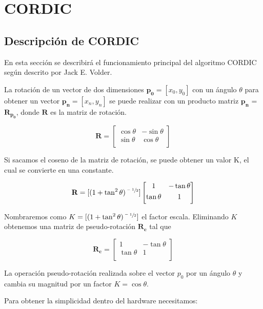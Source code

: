 \chapter{CORDIC}
\section{Descripción de CORDIC}

En esta sección se describirá el funcionamiento principal del algoritmo CORDIC según descrito por Jack E. Volder.

La rotación de un vector de dos dimensiones $\boldsymbol{p_{0}} = [x_{0},y_{0}]$ con un ángulo $\theta$ para obtener un vector $\boldsymbol{p_{n}} = [x_{n},y_{n}]$ se puede realizar con un producto matriz $\boldsymbol{p_{n}}$ = $\boldsymbol{R_{p_{0}}}$, donde $\textbf{R}$ es la matriz de rotación.

\[ \textbf{R} = \begin{bmatrix}
\cos{\theta} & -\sin{\theta} 	\\[0.3em]
\sin{\theta}  & \cos{\theta} 			\\[0.3em]
\end{bmatrix} \]

Si sacamos el coseno de la matriz de rotación, se puede obtener un valor K, el cual se convierte en una constante.

\[ \textbf{R} = [(1 + \tan^2{\theta})^{\sfrac{-1}{2}}] \begin{bmatrix}
1 & -\tan{\theta} 	\\[0.3em]
\tan{\theta}  & 1 			\\[0.3em]
\end{bmatrix} \]

Nombraremos como $K = [(1 + \tan^2{\theta})^{\sfrac{-1}{2}}]$ el factor escala. Eliminando $K$ obtenemos una matriz de pseudo-rotación $\boldsymbol{R_{c}}$ tal que

\[ \boldsymbol{R_{c}} = \begin{bmatrix}
1 & -\tan{\theta} 	\\[0.3em]
\tan{\theta}  & 1 			\\[0.3em]
\end{bmatrix} \]

La operación pseudo-rotación realizada sobre el vector $p_{0}$ por un ángulo $\theta$ y cambia su magnitud por un factor $K = \cos{\theta}$.

Para obtener la simplicidad dentro del hardware necesitamos:

